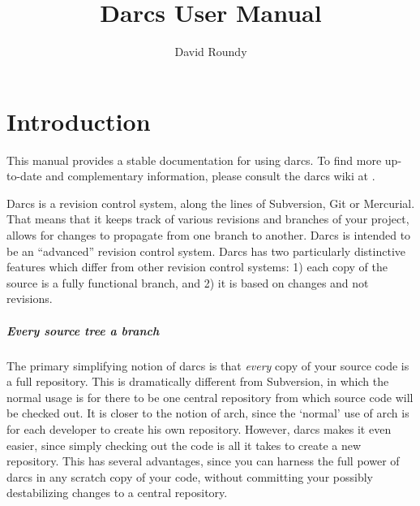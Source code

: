 \documentclass{book}
\begin{document}
\title{Darcs User Manual}
\date{
\darcsVersion
} %
\author{David Roundy}

\maketitle

\tableofcontents

\chapter{Introduction}

This manual provides a stable documentation for using darcs.
To find more up-to-date and complementary information, please consult the
darcs wiki at
.

Darcs is a revision control system, along the lines of Subversion, Git or
Mercurial.  That means that it keeps track of various revisions and branches of your
project, allows for changes to propagate from one branch to another.  Darcs
is intended to be an ``advanced'' revision control system.  Darcs has two
particularly distinctive features which differ from other revision control
systems: 1) each copy of the source is a fully functional branch, and 2)
it is based on changes and not revisions.

\paragraph{Every source tree a branch}
The primary simplifying notion of darcs is that \emph{every} copy of your
source code is a full repository. This is dramatically different from Subversion,
in which the normal usage is for there to be one central repository from
which source code will be checked out. It is closer to the notion of arch,
since the `normal' use of arch is for each developer to create his own
repository. However, darcs makes it even easier, since simply checking out
the code is all it takes to create a new repository. This has several
advantages, since you can harness the full power of darcs in any scratch
copy of your code, without committing your possibly destabilizing changes to
a central repository.

\end{document}
